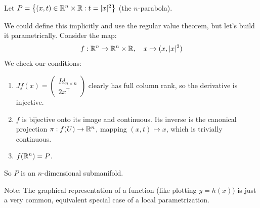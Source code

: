 \begin{example*}[Parabola]
Let $P = \left\{ (x,t) \in \mathbb{R}^n \times \mathbb{R} : t = \lvert x\rvert^2 \right\}$ \textcolor{eGray}{(the $n$-parabola)}.

\begin{center}
\end{center}

We could define this implicitly and use the regular value theorem, but let's build it parametrically. Consider the map:
\[ f: \mathbb{R}^n \to \mathbb{R}^n \times \mathbb{R}, \quad x \mapsto (x, \lvert x\rvert^2) \]
We check our conditions:
\begin{enumerate}
    \item $Jf(x) = \begin{pmatrix} Id_{n \times n} \\ 2x^\top \end{pmatrix}$ clearly has full column rank, so the derivative is injective.
    \item $f$ is bijective onto its image and continuous. Its inverse is the canonical projection $\pi: f(U) \to \mathbb{R}^n$, mapping $(x,t) \mapsto x$, which is trivially continuous.
    \item $f(\mathbb{R}^n) = P$.
\end{enumerate}
So $P$ is an $n$-dimensional submanifold.
\end{example*}

\textcolor{eGray}{Note: The graphical representation of a function (like plotting $y = h(x)$) is just a very common, equivalent special case of a local parametrization.}

